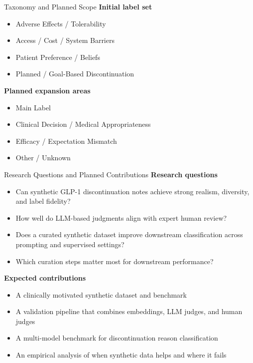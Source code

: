 \documentclass[aspectratio=169]{beamer}
\begin{document}
\begin{frame}{Taxonomy and Planned Scope}
    \textbf{Initial label set}
    \begin{itemize}
        \item Adverse Effects / Tolerability
        \item Access / Cost / System Barriers
        \item Patient Preference / Beliefs
        \item Planned / Goal-Based Discontinuation
    \end{itemize}

    \vspace{0.5em}
    \textbf{Planned expansion areas}
    \begin{itemize}
        \item Main Label
        \item Clinical Decision / Medical Appropriateness
        \item Efficacy / Expectation Mismatch
        \item Other / Unknown
    \end{itemize}
\end{frame}

\begin{frame}{Research Questions and Planned Contributions}
    \small
    \textbf{Research questions}
    \begin{itemize}
        \item Can synthetic GLP-1 discontinuation notes achieve strong realism, diversity, and label fidelity?
        \item How well do LLM-based judgments align with expert human review?
        \item Does a curated synthetic dataset improve downstream classification across prompting and supervised settings?
        \item Which curation steps matter most for downstream performance?
    \end{itemize}

    \textbf{Expected contributions}
    \begin{itemize}
        \item A clinically motivated synthetic dataset and benchmark
        \item A validation pipeline that combines embeddings, LLM judges, and human judges
        \item A multi-model benchmark for discontinuation reason classification
        \item An empirical analysis of when synthetic data helps and where it fails
    \end{itemize}
\end{frame}
\end{document}
